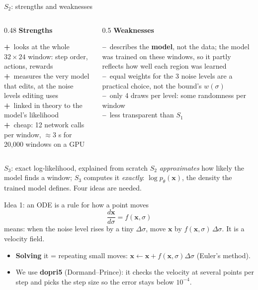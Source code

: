 \documentclass[aspectratio=169,11pt]{beamer}
\newcommand{\x}{\bm{x}}
\newcommand{\pro}{\textcolor{green!45!black}{\textbf{+}}\ }
\newcommand{\con}{\textcolor{red!60!black}{\textbf{--}}\ }
\begin{document}
\begin{frame}{$S_2$: strengths and weaknesses}
\begin{columns}[T]
\begin{column}{0.48\linewidth}
\textbf{Strengths}
\vspace{0.3em}

\pro looks at the whole $32\times24$ window: step order, actions, rewards\\[3pt]
\pro measures the very model that edits, at the noise levels editing uses\\[3pt]
\pro linked in theory to the model's likelihood\\[3pt]
\pro cheap: 12 network calls per window, $\approx3$ s for 20{,}000 windows on a GPU
\end{column}
\begin{column}{0.5\linewidth}
\textbf{Weaknesses}
\vspace{0.3em}

\con describes the \textbf{model}, not the data; the model was trained on these windows, so it partly reflects how well each region was learned\\[3pt]
\con equal weights for the 3 noise levels are a practical choice, not the bound's $w(\sigma)$\\[3pt]
\con only 4 draws per level: some randomness per window\\[3pt]
\con less transparent than $S_1$
\end{column}
\end{columns}
\end{frame}

\begin{frame}{$S_3$: exact log-likelihood, explained from scratch}
$S_2$ \emph{approximates} how likely the model finds a window; $S_3$ computes it \emph{exactly}: $\log p_\theta(\x)$, the density the trained model defines. Four ideas are needed.
\vspace{0.5em}
\begin{block}{Idea 1: an ODE is a rule for how a point moves}
\[
\frac{d\x}{d\sigma}=f(\x,\sigma)
\]
means: when the noise level rises by a tiny $\Delta\sigma$, move $\x$ by $f(\x,\sigma)\,\Delta\sigma$. It is a velocity field.
\begin{itemize}
\item \textbf{Solving} it = repeating small moves: $\x\leftarrow\x+f(\x,\sigma)\Delta\sigma$ (Euler's method).
\item We use \textbf{dopri5} (Dormand--Prince): it checks the velocity at several points per step and picks the step size so the error stays below $10^{-4}$.
\end{itemize}
\end{block}
\end{frame}
\end{document}
